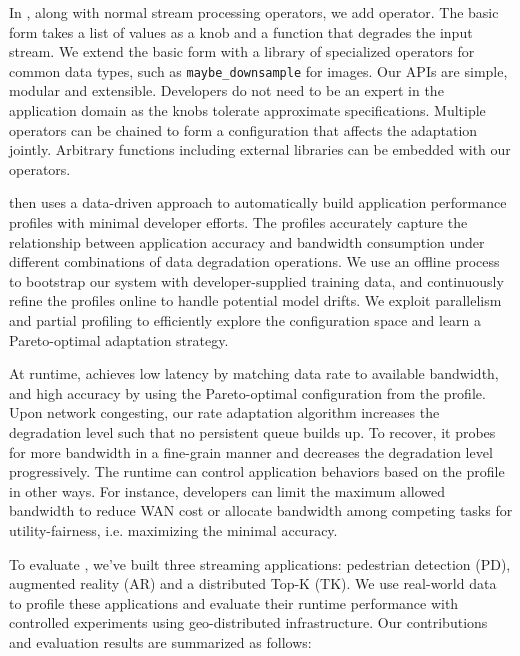 In \sysname{}, along with normal stream processing operators, we add \maybe{}
operator. The basic form takes a list of values as a knob and a function that
degrades the input stream. We extend the basic form with a library of
specialized operators for common data types, such as \texttt{maybe\_downsample}
for images.  Our APIs are simple, modular and extensible. Developers do not need
to be an expert in the application domain as the knobs tolerate approximate
specifications. Multiple operators can be chained to form a configuration that
affects the adaptation jointly. Arbitrary functions including external libraries
can be embedded with our operators.

\sysname{} then uses a data-driven approach to automatically build application
performance profiles with minimal developer efforts. The profiles accurately
capture the relationship between application accuracy and bandwidth consumption
under different combinations of data degradation operations. We use an offline
process to bootstrap our system with developer-supplied training data, and
continuously refine the profiles online to handle potential model drifts. We
exploit parallelism and partial profiling to efficiently explore the
configuration space and learn a Pareto-optimal adaptation strategy.

At runtime, \sysname{} achieves low latency by matching data rate to available
bandwidth, and high accuracy by using the Pareto-optimal configuration from the
profile. Upon network congesting, our rate adaptation algorithm increases the
degradation level such that no persistent queue builds up. To recover, it probes
for more bandwidth in a fine-grain manner and decreases the degradation level
progressively. The runtime can control application behaviors based on the
profile in other ways. For instance, developers can limit the maximum allowed
bandwidth to reduce WAN cost or allocate bandwidth among competing tasks for
utility-fairness, i.e. maximizing the minimal accuracy.

To evaluate \sysname{}, we've built three streaming applications: pedestrian
detection (PD), augmented reality (AR) and a distributed Top-K (TK). We use
real-world data to profile these applications and evaluate their runtime
performance with controlled experiments using geo-distributed
infrastructure. Our contributions and evaluation results are summarized as
follows:

